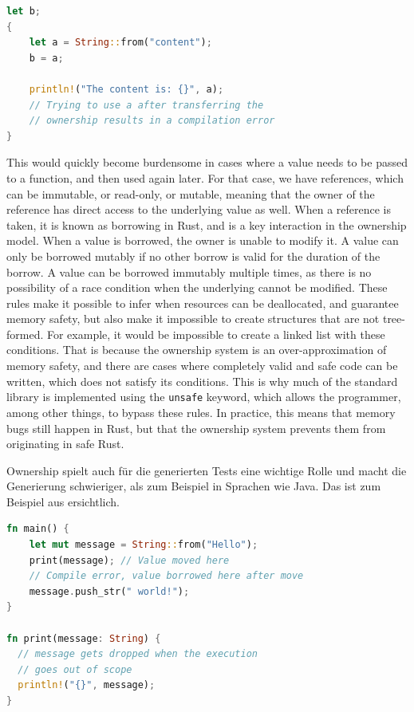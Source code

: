 \documentclass[paper=a4,%
  twoside,%
  BCOR4mm,%
  abstract=true,%
  toc=bibliography,%
  chapterprefix=true,%
  toc=bibliographynumbered,%
  open=right,%
  english,%
  pagesize=pdftex]{scrreprt}
\begin{document}
\begin{lstlisting}[language=Rust, style=boxed, caption=Transferring Ownership, label=lst:transfer-ownership]
let b;
{
    let a = String::from("content");
    b = a;

    println!("The content is: {}", a);
    // Trying to use a after transferring the
    // ownership results in a compilation error
}
\end{lstlisting}

This would quickly become burdensome in cases where a value needs to be passed to a function, and then used again later. For that case, we have references, which can be immutable, or read-only, or mutable, meaning that the owner of the reference has direct access to the underlying value as well. When a reference is taken, it is known as borrowing in Rust, and is a key interaction in the ownership model. When a value is borrowed, the owner is unable to modify it. A value can only be borrowed mutably if no other borrow is valid for the duration of the borrow. A value can be borrowed immutably multiple times, as there is no possibility of a race condition when the underlying cannot be modified. These rules make it possible to infer when resources can be deallocated, and guarantee memory safety, but also make it impossible to create structures that are not tree-formed. For example, it would be impossible to create a linked list with these conditions. That is because the ownership system is an over-approximation of memory safety, and there are cases where completely valid and safe code can be written, which does not satisfy its conditions. This is why much of the standard library is implemented using the \lstinline{unsafe} keyword, which allows the programmer, among other things, to bypass these rules. In practice, this means that memory bugs still happen in Rust, but that the ownership system prevents them from originating in safe Rust.

Ownership spielt auch für die generierten Tests eine wichtige Rolle und macht die Generierung schwieriger, als zum Beispiel in Sprachen wie Java. Das ist zum Beispiel aus  ersichtlich.
\begin{lstlisting}[language=Rust, style=boxed, caption={Transferring the ownership to a method}, label=lst:ownership-method-call]
fn main() {
    let mut message = String::from("Hello");
    print(message); // Value moved here
    // Compile error, value borrowed here after move
    message.push_str(" world!");
}

fn print(message: String) {
  // message gets dropped when the execution
  // goes out of scope
  println!("{}", message);
}
\end{lstlisting}
\end{document}
